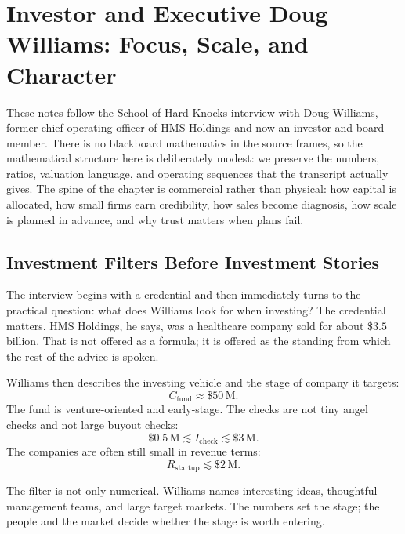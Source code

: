 \chapter{Investor and Executive Doug Williams: Focus, Scale, and Character}

These notes follow the School of Hard Knocks interview with Doug Williams, former chief operating officer of HMS Holdings and now an investor and board member. There is no blackboard mathematics in the source frames, so the mathematical structure here is deliberately modest: we preserve the numbers, ratios, valuation language, and operating sequences that the transcript actually gives. The spine of the chapter is commercial rather than physical: how capital is allocated, how small firms earn credibility, how sales become diagnosis, how scale is planned in advance, and why trust matters when plans fail.

\section{Investment Filters Before Investment Stories}

The interview begins with a credential and then immediately turns to the practical question: what does Williams look for when investing? The credential matters. HMS Holdings, he says, was a healthcare company sold for about \(\$3.5\) billion. That is not offered as a formula; it is offered as the standing from which the rest of the advice is spoken.

Williams then describes the investing vehicle and the stage of company it targets:
\begin{equation}
C_{\mathrm{fund}} \approx \$50\,\mathrm{M}.
\end{equation}
The fund is venture-oriented and early-stage. The checks are not tiny angel checks and not large buyout checks:
\begin{equation}
\$0.5\,\mathrm{M} \lesssim I_{\mathrm{check}} \lesssim \$3\,\mathrm{M}.
\end{equation}
The companies are often still small in revenue terms:
\begin{equation}
R_{\mathrm{startup}} \lesssim \$2\,\mathrm{M}.
\end{equation}

The filter is not only numerical. Williams names interesting ideas, thoughtful management teams, and large target markets. The numbers set the stage; the people and the market decide whether the stage is worth entering.


